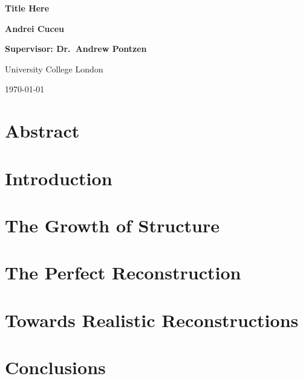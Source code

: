 \documentclass[12pt,aas_macros,twoside]{report}
\begin{document}
\begin{titlepage}
    \begin{center}
        
        \vspace*{5cm}
        {\fontsize{50}{60}\selectfont \textbf{Title Here}}
        
        
        \vspace{3cm}
        
        \Huge
        \textbf{Andrei Cuceu}
        
        
        \vspace{1cm}
        
        \huge
        \textbf{Supervisor: Dr.\ Andrew Pontzen}
        
        \vspace{7cm}
        
        \huge
        University College London
        
        \vspace{0.5cm}
        \huge
        \today
        
    \end{center}
\end{titlepage}



\chapter*{\Huge Abstract}

\cite{Eisenstein_BAOpeak_reconstruction}

\tableofcontents

\newpage
\chapter{Introduction}


\newpage
\chapter{The Growth of Structure}


% 

\newpage
\chapter{The Perfect Reconstruction}


\newpage
\chapter{Towards Realistic Reconstructions}


\newpage
\chapter{Conclusions}


\printbibliography{}
\end{document}
